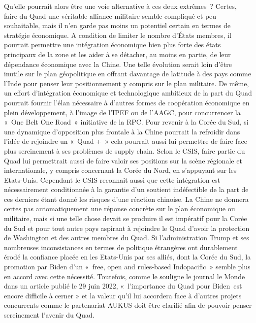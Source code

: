 \documentclass[11pt,a4paper]{article}
\begin{document}
Qu'elle pourrait alors être une voie alternative à ces deux extrêmes~? Certes, faire du Quad une véritable alliance militaire semble compliqué et peu souhaitable, mais il n'en garde pas moins un potentiel certain en termes de stratégie économique. A condition de limiter le nombre d'États membres, il pourrait permettre une intégration économique bien plus forte des états principaux de la zone et les aider à se détacher, au moins en partie, de leur dépendance économique avec la Chine. Une telle évolution serait loin d'être inutile sur le plan géopolitique en offrant davantage de latitude à des pays comme l'Inde pour penser leur positionnement y compris sur le plan militaire. De même, un effort d'intégration économique et technologique ambitieux de la part du Quad pourrait fournir l'élan nécessaire à d'autres formes de coopération économique en plein développement, à l'image de l'IPEF ou de l'AAGC, pour concurrencer la «~One Belt One Road~» initiative de la RPC. Pour revenir à la Corée du Sud, si une dynamique d'opposition plus frontale à la Chine pourrait la refroidir dans l'idée de rejoindre un «~Quad +~» cela pourrait aussi lui permettre de faire face plus sereinement à ses problèmes de supply chain. Selon le CSIS, faire partie du Quad lui permettrait aussi de faire valoir ses positions sur la scène régionale et internationale, y compris concernant la Corée du Nord, en s'appuyant sur les Etats-Unis. Cependant le CSIS reconnait aussi que cette intégration est nécessairement conditionnée à la garantie d'un soutient indéfectible de la part de ces derniers étant donné les risques d'une réaction chinoise. La Chine ne donnera certes pas automatiquement une réponse concrète sur le plan économique ou militaire, mais si une telle chose devait se produire il est impératif pour la Corée du Sud et pour tout autre pays aspirant à rejoindre le Quad d'avoir la protection de Washington et des autres membres du Quad. Si l'administration Trump et ses nombreuses inconsistances en termes de politique étrangères ont durablement érodé la confiance placée en les Etats-Unis par ses alliés, dont la Corée du Sud, la promotion par Biden d'un «~free, open and rules-based Indopacific~» semble plus en accord avec cette nécessité. Toutefois, comme le souligne le journal le Monde dans un article publié le 29 juin 2022, «~l'importance du Quad pour Biden~est encore difficile à cerner » et la valeur qu'il lui accordera face à d'autres projets concurrents comme le partenariat AUKUS doit être clarifié afin de pouvoir penser sereinement l'avenir du Quad.
\end{document}

